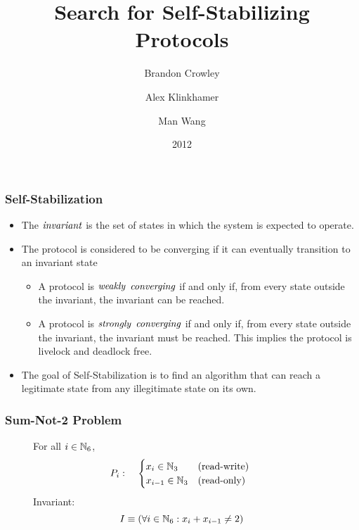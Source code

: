 \documentclass[handout]{beamer}
\title{Search for Self-Stabilizing Protocols}
\author{Brandon Crowley \and Alex Klinkhamer \and Man Wang}
\institute{Michigan Technological University}
\date{2012}
\begin{document}
\setlength{\abovedisplayskip}{0.5em}
\setlength{\abovedisplayshortskip}{0.5em}
\setlength{\belowdisplayskip}{0.5em}
\setlength{\belowdisplayshortskip}{0.5em}
\setlength{\abovecaptionskip}{0.0em}
\setlength{\belowcaptionskip}{0.0em}

\begin{frame}
\titlepage
\end{frame}

\begin{frame}
\frametitle{Self-Stabilization}
\begin{itemize}
\item The $\mathit{invariant}$ is the set of states in which the system is expected to operate.
\item The protocol is considered to be converging if it can eventually transition to an invariant state
 \begin{itemize}
 \item A protocol is $\mathit{weakly}$ $\mathit{converging}$ if and only if, from every state outside the
    invariant, the invariant can be reached\cite{wssGouda01}.
 \item A protocol is $\mathit{strongly}$ $\mathit{converging}$ if and only if, from every state outside the
    invariant, the invariant must be reached.  This implies the protocol is livelock and deadlock
    free\cite{wssGouda01}.
 \end{itemize}
\item The goal of Self-Stabilization is to find an algorithm that can reach a legitimate state from
    any illegitimate state on its own.
\end{itemize}
\end{frame}

\begin{frame}
\frametitle{Sum-Not-2 Problem}
\begin{figure}

\begin{flushleft}
For all $i\in\mathbb{N}_6$,
\begin{eqnarray*}
P_i & : &
 \mbox{
  $\begin{cases}
  x_i\in\mathbb{N}_3 & \mbox{(read-write)} \\
  x_{i-1}\in\mathbb{N}_3 & \mbox{(read-only)} \\
  \end{cases}$
 }
\end{eqnarray*}
Invariant:
\[ I \equiv (\forall i\in\mathbb{N}_6: x_i + x_{i-1} \ne 2) \]
\end{flushleft}
\end{figure}
\end{frame}
\end{document}
